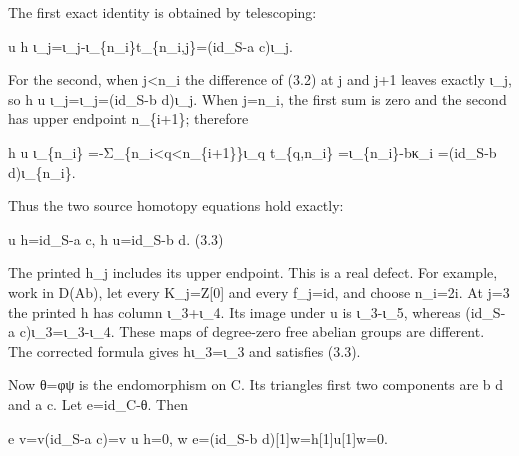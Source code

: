 The first exact identity is obtained by telescoping:\allowbreak{}

u h ι\_\allowbreak{}j\allowbreak{}=ι\_\allowbreak{}j-ι\_\allowbreak{}\{n\_\allowbreak{}i\}t\_\allowbreak{}\{n\_\allowbreak{}i,\allowbreak{}j\}\allowbreak{}=(id\_\allowbreak{}S-a c)\allowbreak{}ι\_\allowbreak{}j.

For the second,\allowbreak{} when j<n\_\allowbreak{}i the difference of (3.2)\allowbreak{} at j and j\allowbreak{}+1 leaves exactly ι\_\allowbreak{}j,\allowbreak{} so h u ι\_\allowbreak{}j\allowbreak{}=ι\_\allowbreak{}j\allowbreak{}=(id\_\allowbreak{}S-b d)\allowbreak{}ι\_\allowbreak{}j. When j\allowbreak{}=n\_\allowbreak{}i,\allowbreak{} the first sum is zero and the second has upper endpoint n\_\allowbreak{}\{i\allowbreak{}+1\}; therefore

h u ι\_\allowbreak{}\{n\_\allowbreak{}i\} \allowbreak{}=-Σ\_\allowbreak{}\{n\_\allowbreak{}i<q<n\_\allowbreak{}\{i\allowbreak{}+1\}\}ι\_\allowbreak{}q t\_\allowbreak{}\{q,\allowbreak{}n\_\allowbreak{}i\} \allowbreak{}=ι\_\allowbreak{}\{n\_\allowbreak{}i\}-bκ\_\allowbreak{}i \allowbreak{}=(id\_\allowbreak{}S-b d)\allowbreak{}ι\_\allowbreak{}\{n\_\allowbreak{}i\}.

Thus the two source homotopy equations hold exactly:\allowbreak{}

u h\allowbreak{}=id\_\allowbreak{}S-a c,\allowbreak{} h u\allowbreak{}=id\_\allowbreak{}S-b d. (3.3)\allowbreak{}

The printed h\_\allowbreak{}j includes its upper endpoint. This is a real defect. For example,\allowbreak{} work in D(Ab)\allowbreak{},\allowbreak{} let every K\_\allowbreak{}j\allowbreak{}=Z[0]\allowbreak{} and every f\_\allowbreak{}j\allowbreak{}=id,\allowbreak{} and choose n\_\allowbreak{}i\allowbreak{}=2i. At j\allowbreak{}=3 the printed h has column ι\_\allowbreak{}3\allowbreak{}+ι\_\allowbreak{}4. Its image under u is ι\_\allowbreak{}3-ι\_\allowbreak{}5,\allowbreak{} whereas (id\_\allowbreak{}S-a c)\allowbreak{}ι\_\allowbreak{}3\allowbreak{}=ι\_\allowbreak{}3-ι\_\allowbreak{}4. These maps of degree-zero free abelian groups are different. The corrected formula gives hι\_\allowbreak{}3\allowbreak{}=ι\_\allowbreak{}3 and satisfies (3.3)\allowbreak{}.

Now θ\allowbreak{}=φψ is the endomorphism on C. Its triangle\textquotesingle s first two components are b d and a c. Let e\allowbreak{}=id\_\allowbreak{}C-θ. Then

e v\allowbreak{}=v(id\_\allowbreak{}S-a c)\allowbreak{}\allowbreak{}=v u h\allowbreak{}=0,\allowbreak{} w e\allowbreak{}=(id\_\allowbreak{}S-b d)\allowbreak{}[1]\allowbreak{}w\allowbreak{}=h[1]\allowbreak{}u[1]\allowbreak{}w\allowbreak{}=0.


